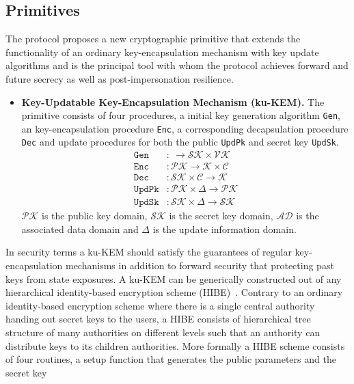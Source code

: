 \documentclass[11pt,a4paper,twoside,openright,bibliography=totoc]{scrbook}
\begin{document}
\subsection{Primitives}
\label{sec:primitives}

The protocol proposes a new cryptographic primitive that extends the
functionality of an ordinary key-encapsulation mechanism with
key update algorithms and is the principal tool with whom the
protocol achieves forward and future secrecy as well as
post-impersonation resilience.
\begin{itemize}
\item \textbf{Key-Updatable Key-Encapsulation Mechanism (ku-KEM).} The primitive
  consists of four procedures, a initial key generation algorithm \texttt{Gen}, an
  key-encapsulation procedure \texttt{Enc}, a corresponding decapsulation
  procedure \texttt{Dec} and
  update procedures for both the public \texttt{UpdPk} and secret key \texttt{UpdSk}.
  \begin{align*}
    \texttt{Gen} & : \ \rightarrow \mathcal{SK} \times \mathcal{VK} \\
    \texttt{Enc} & : \mathcal{PK} \rightarrow \mathcal{K} \times \mathcal{C} \\ 
    \texttt{Dec} & : \mathcal{SK} \times \mathcal{C} \rightarrow \mathcal{K} \\
    \texttt{UpdPk} & : \mathcal{PK} \times \Delta \rightarrow \mathcal{PK} \\
    \texttt{UpdSk} & : \mathcal{SK} \times \Delta \rightarrow \mathcal{SK}
  \end{align*}
  $\mathcal{PK}$ is the public key domain, $\mathcal{SK}$ is the secret key domain,
  $\mathcal{AD}$ is the associated data domain and $\Delta$ is
  the update information domain.
\end{itemize}
In security terms a ku-KEM should satisfy the guarantees of regular
key-encapsulation mechanisms in addition to forward security that
protecting past keys from state exposures. A ku-KEM can be generically constructed
out of any hierarchical identity-based encryption scheme
(HIBE)~\cite{gentry2002hierarchical}. Contrary to an ordinary
identity-based encryption scheme where there is a single central
authority handing out secret keys to the users, a HIBE consists
of hierarchical tree structure of many authorities on different levels
such that an authority can distribute keys to its children authorities.
More formally a HIBE scheme consists of four routines, a setup
function that generates the public parameters and the secret key
\end{document}
